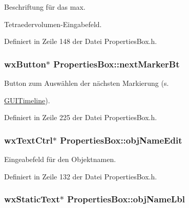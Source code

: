 Beschriftung für das max. 

Tetraedervolumen-\/\-Eingabefeld. 

Definiert in Zeile 148 der Datei Properties\-Box.\-h.

\hypertarget{classPropertiesBox_ad4a347a273ab780cf1ab941a5cf6d4b0}{
\subsubsection[{next\-Marker\-Bt}]{\setlength{\rightskip}{0pt plus 5cm}wx\-Button$\ast$ Properties\-Box\-::next\-Marker\-Bt\hspace{0.3cm}{\ttfamily [private]}}}\label{classPropertiesBox_ad4a347a273ab780cf1ab941a5cf6d4b0}


Button zum Auswählen der nächsten Markierung (s. 

\hyperlink{classGUITimeline}{G\-U\-I\-Timeline}). 

Definiert in Zeile 225 der Datei Properties\-Box.\-h.

\hypertarget{classPropertiesBox_a7bb26289d5da39d7996c794216f4d89b}{
\subsubsection[{obj\-Name\-Edit}]{\setlength{\rightskip}{0pt plus 5cm}wx\-Text\-Ctrl$\ast$ Properties\-Box\-::obj\-Name\-Edit\hspace{0.3cm}{\ttfamily [private]}}}\label{classPropertiesBox_a7bb26289d5da39d7996c794216f4d89b}


Eingeabefeld für den Objektnamen. 



Definiert in Zeile 132 der Datei Properties\-Box.\-h.

\hypertarget{classPropertiesBox_ac281563a94d4cdffd51084d88cafc692}{
\subsubsection[{obj\-Name\-Lbl}]{\setlength{\rightskip}{0pt plus 5cm}wx\-Static\-Text$\ast$ Properties\-Box\-::obj\-Name\-Lbl\hspace{0.3cm}{\ttfamily [private]}}}\label{classPropertiesBox_ac281563a94d4cdffd51084d88cafc692}


